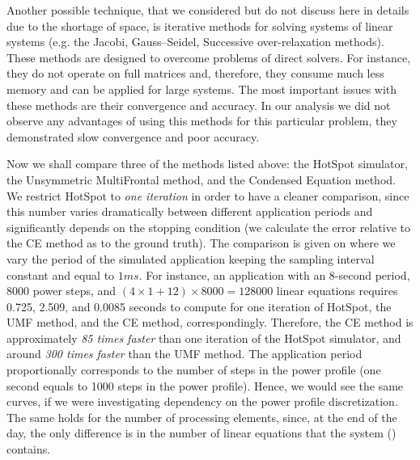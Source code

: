 Another possible technique, that we considered but do not discuss here in details due to the shortage of space, is iterative methods for solving systems of linear systems (e.g. the Jacobi, Gauss–Seidel, Successive over-relaxation methods). These methods are designed to overcome problems of direct solvers. For instance, they do not operate on full matrices and, therefore, they consume much less memory and can be applied for large systems. The most important issues with these methods are their convergence and accuracy. In our analysis we did not observe any advantages of using this methods for this particular problem, they demonstrated slow convergence and poor accuracy.

Now we shall compare three of the methods listed above: the HotSpot simulator, the Unsymmetric MultiFrontal method, and the Condensed Equation method. We restrict HotSpot to \emph{one iteration} in order to have a cleaner comparison, since this number varies dramatically between different application periods and significantly depends on the stopping condition (we calculate the error relative to the CE method as to the ground truth). The comparison is given on  where we vary the period of the simulated application keeping the sampling interval constant and equal to $1 ms$. For instance, an application with an 8-second period, 8000 power steps, and $(4 \times 1 + 12) \times 8000 = 128000$ linear equations requires 0.725, 2.509, and 0.0085 seconds to compute for one iteration of HotSpot, the UMF method, and the CE method, correspondingly. Therefore, the CE method is approximately \emph{85 times faster} than one iteration of the HotSpot simulator, and around \emph{300 times faster} than the UMF method. The application period proportionally corresponds to the number of steps in the power profile (one second equals to 1000 steps in the power profile). Hence, we would see the same curves, if we were investigating dependency on the power profile discretization. The same holds for the number of processing elements, since, at the end of the day, the only difference is in the number of linear equations that the system () contains.
